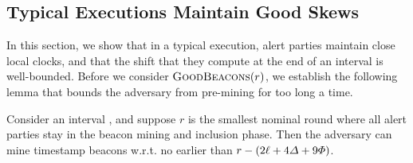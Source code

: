 \subsection{Typical Executions Maintain Good Skews}

In this section, we show that in a typical execution, alert parties maintain close local clocks, and that the shift that they compute at the end of an interval is well-bounded.
%
Before we consider $\textsc{GoodBeacons}(r)$, we establish the following lemma that bounds the adversary from pre-mining for too long a time.

\begin{lemma} \label{lemma:beacon-pre-mining}
    Consider an interval \interval, and suppose $r$ is the smallest nominal round where all alert parties stay in the beacon mining and inclusion phase.
    Then the adversary can mine timestamp beacons w.r.t. \interval no earlier than $r - (2\ell + 4\varDelta + 9\varPhi)$.
\end{lemma}

